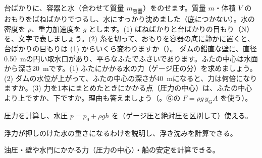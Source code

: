 \bkproblem 台ばかりに、容器と水（合わせて質量 $m_{\text{容器}}$）をのせます。質量 $m$・体積 $V$ のおもりをばねばかりでつるし、水にすっかり沈めました（底につかない）。水の密度を $\rho$、重力加速度を $g$ とします。(1) ばねばかりと台ばかりの目もり（N）を、文字で表しましょう。(2) 糸を切って、おもりを容器の底に静かに置くと、台ばかりの目もりは (1) からいくら変わりますか（\nobreak{}\nobreak）。
\bkproblem ダムの鉛直な壁に、直径\qty{0.50}{m}の円い取水口があり、平らなふたでふさいであります。ふたの中心は水面から深さ\qty{20}{m}です。(1) ふたにかかる水の力（ゲージ圧の分）を求めましょう。(2) ダムの水位が上がって、ふたの中心の深さが\qty{40}{m}になると、力は何倍になりますか。(3) 力を1本にまとめたときにかかる点（圧力の中心）は、ふたの中心より上ですか、下ですか。理由も答えましょう（\nobreak{}。⑥の $F=\rho g\,y_{\mathrm{G}}A$ を使う）。

\begin{furikaeri}
\begin{checklist}
\item 圧力を計算し、水圧 $p=p_0+\rho gh$ を（ゲージ圧と絶対圧を区別して）使える。
\item 浮力が押しのけた水の重さになるわけを説明し、浮き沈みを計算できる。
\item 油圧・壁や水門にかかる力（圧力の中心）・船の安定を計算できる。
\end{checklist}
\end{furikaeri}
